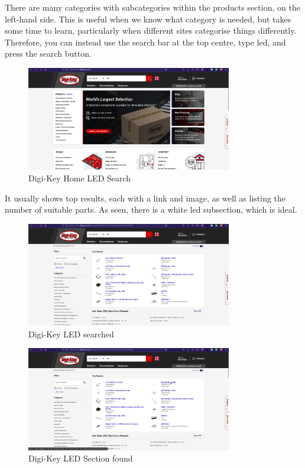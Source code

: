 \documentclass[a4paper,11pt]{report}
\begin{document}
There are many categories with subcategories within the products section, on the left-hand side. This is useful when we know what category is needed, but takes some time to learn, particularly when different sites categorise things differently. Therefore, you can instead use the search bar at the top centre, type \gls{led}, and press the search button.

\begin{figure}[H]
\centering
\includegraphics[width=0.8\textwidth]{screenshots/DigiKeyHomeLEDSearch}
\caption{Digi-Key Home LED Search}
\end{figure}

It usually shows top results, each with a link and image, as well as listing the number of suitable parts. As seen, there is a white \gls{led} subsection, which is ideal.

\begin{figure}[H]
\centering
\includegraphics[width=0.8\textwidth]{screenshots/DigiKeyLEDSearched}
\caption{Digi-Key LED searched}
\end{figure}
\begin{figure}[H]
\centering
\includegraphics[width=0.8\textwidth]{screenshots/DigiKeyWhiteLEDSectionFound}
\caption{Digi-Key LED Section found}
\end{figure}
\end{document}
